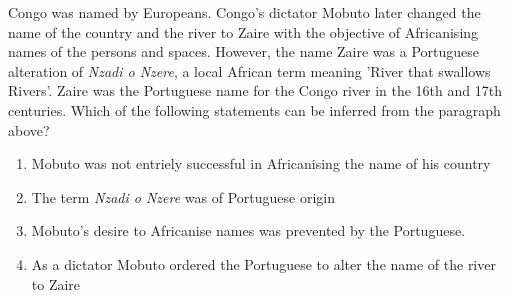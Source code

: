     \item \label{Q8} Congo was named by Europeans. Congo's dictator Mobuto later changed the name of the country and the river to Zaire with the objective of Africanising names of the persons and spaces. However, the name Zaire was a Portuguese alteration of \textit{Nzadi o Nzere}, a local African term meaning 'River that swallows Rivers'. Zaire was the Portuguese name for the Congo river in the 16th and 17th centuries.
    Which of the following statements can be inferred from the paragraph above?
    \begin{enumerate}
        \item Mobuto was not entriely successful in Africanising the name of his country
        \item The term \textit{Nzadi o Nzere} was of Portuguese origin
        \item Mobuto's desire to Africanise names was prevented by the Portuguese.
        \item As a dictator Mobuto ordered the Portuguese to alter the name of the river to Zaire
    \end{enumerate}

